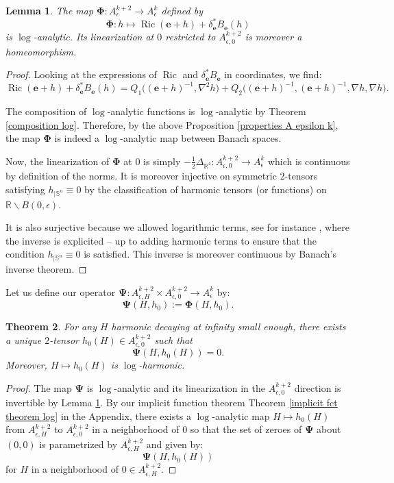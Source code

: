 \documentclass[12pt]{article}
\newtheorem{thm}{Theorem}[section]
\newtheorem{lem}[thm]{Lemma}
\DeclareMathOperator{\Ric}{\operatorname{Ric}}
\begin{document}
    \begin{lem}\label{invertibility linearization}
        The map $\mathbf{\Phi}: A^{k+2}_\epsilon\to A^{k}_\epsilon$ defined by
        $$\mathbf{\Phi}: h\mapsto \Ric(\mathbf{e}+h)+ \delta^*_{\mathbf{e}}B_{\mathbf{e}}(h)$$
        is $\log$-analytic. Its linearization at $0$ restricted to $A_{\epsilon,0}^{k+2}$ is moreover a homeomorphism.
    \end{lem}
    \begin{proof}
         Looking at the expressions of $\Ric$ and $\delta_\mathbf{e}^*B_\mathbf{e}$ in coordinates, we find:
         $$\Ric (\mathbf{e}+h)+ \delta^*_{\mathbf{e}}B_{\mathbf{e}}(h) = Q_1\Big((\mathbf{e}+h)^{-1},\nabla^2 h\Big) + Q_2\Big((\mathbf{e}+h)^{-1},(\mathbf{e}+h)^{-1},\nabla h,\nabla h\Big).$$
        
    
    The composition of $\log$-analytic functions is $\log$-analytic by Theorem \ref{composition log}. Therefore, by the above Proposition \ref{properties A epsilon k}, the map $\mathbf{\Phi}$ is indeed a $\log$-analytic map between Banach spaces.
    
    Now, the linearization of $\mathbf{\Phi}$ at $0$ is simply $-\frac{1}{2}\Delta_{\mathbb{R}^4}:A_{\epsilon,0}^{k+2}\to A^k_\epsilon$ which is continuous by definition of the norms. It is moreover injective on symmetric $2$-tensors satisfying $h_{|\mathbb{S}^n} \equiv 0$ by the classification of harmonic tensors (or functions) on $\mathbb{R}\backslash B(0,\epsilon)$. 
    
    It is also surjective because we allowed logarithmic terms, see for instance \cite[Proposition 4.1]{che}, where the inverse is explicited -- up to adding harmonic terms to ensure that the condition $h_{|\mathbb{S}^n} \equiv 0$ is satisfied. This inverse is moreover continuous by Banach's inverse theorem.
    \end{proof}
    
    
    Let us define our operator $\mathbf{\Psi}:A_{\epsilon,H}^{k+2}\times A_{\epsilon,0}^{k+2}\to A_{\epsilon}^k$ by:
    $$ \mathbf{\Psi}(H,h_0):= \mathbf{\Phi}(H,h_0). $$
    
    \begin{thm}
        For any $ H $ harmonic decaying at infinity small enough, there exists a unique $2$-tensor $h_0(H)\in A_{\epsilon,0}^{k+2}$ such that $$\mathbf{\Psi}(H,h_0(H)) = 0.$$
        Moreover, $H\mapsto h_0(H)$ is $\log$-harmonic.
    \end{thm}
    \begin{proof}
        The map $\mathbf{\Psi}$ is $\log$-analytic and its linearization in the $A_{\epsilon,0}^{k+2}$ direction is invertible by Lemma \ref{invertibility linearization}. By our implicit function theorem Theorem \ref{implicit fct theorem log} in the Appendix, there exists a $\log$-analytic map $H\mapsto h_0(H)$ from $A_{\epsilon,H}^{k+2}$ to $A_{\epsilon,0}^{k+2}$ in a neighborhood of $0$ so that the set of zeroes of $\mathbf{\Psi}$ about $(0,0)$ is parametrized by $A_{\epsilon,H}^{k+2}$ and given by: 
        $$\mathbf{\Psi}(H,h_0(H))$$
        for $H$ in a neighborhood of  $0\in A_{\epsilon,H}^{k+2}$.
    \end{proof}
    
\end{document}
